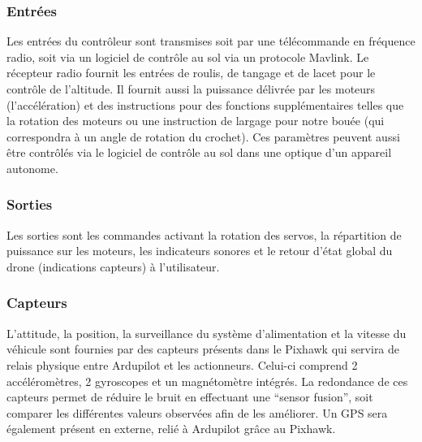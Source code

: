 \documentclass[a4paper,12pt,french]{report}
\begin{document}
\subsubsection{Entrées}
Les entrées du contrôleur sont transmises soit par une télécommande en fréquence radio, soit via un logiciel de contrôle au sol via un protocole Mavlink. Le récepteur radio fournit les entrées de roulis, de tangage et de lacet pour le contrôle de l’altitude. Il fournit aussi la puissance délivrée par les moteurs (l’accélération) et des instructions pour des fonctions supplémentaires telles que la rotation des moteurs ou une instruction de largage pour notre bouée (qui correspondra à un angle de rotation du crochet). Ces paramètres peuvent aussi être contrôlés via le logiciel de contrôle au sol dans une optique d’un appareil autonome.

\subsubsection{Sorties}

Les sorties sont les commandes activant la rotation des servos, la répartition de puissance sur les moteurs, les indicateurs sonores et le retour d’état global du drone (indications capteurs) à l’utilisateur.

\subsubsection{Capteurs}

L'attitude, la position, la surveillance du système d'alimentation et la vitesse du véhicule sont fournies par des capteurs présents dans le Pixhawk qui servira de relais physique entre Ardupilot et les actionneurs. Celui-ci comprend 2 accéléromètres, 2 gyroscopes et un magnétomètre intégrés. La redondance de ces capteurs permet de réduire le bruit en effectuant une “sensor fusion”, soit comparer les différentes valeurs observées afin de les améliorer. Un GPS sera également présent en externe, relié à Ardupilot grâce au Pixhawk.
\end{document}

